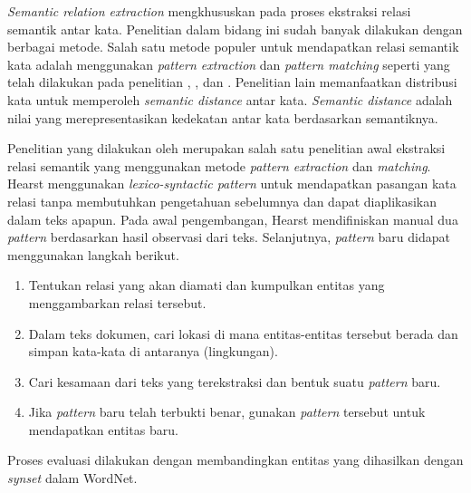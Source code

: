 \textit{Semantic relation extraction} mengkhususkan pada proses ekstraksi relasi semantik antar kata. Penelitian dalam bidang ini sudah banyak dilakukan dengan berbagai metode. Salah satu metode populer untuk mendapatkan relasi semantik kata adalah menggunakan \textit{pattern extraction} dan \textit{pattern matching} seperti yang telah dilakukan pada penelitian \cite{hearst1992automatic}, \cite{ruiz2005automatic}, dan \cite{arnold2014extracting}. Penelitian lain memanfaatkan distribusi kata untuk memperoleh \textit{semantic distance} antar kata. \textit{Semantic distance} adalah nilai yang merepresentasikan kedekatan antar kata berdasarkan semantiknya.

Penelitian yang dilakukan oleh \cite{hearst1992automatic} merupakan salah satu penelitian awal ekstraksi relasi semantik yang menggunakan metode \textit{pattern extraction} dan \textit{matching}. Hearst menggunakan \textit{lexico-syntactic pattern} untuk mendapatkan pasangan kata relasi tanpa membutuhkan pengetahuan sebelumnya dan dapat diaplikasikan dalam teks apapun. Pada awal pengembangan, Hearst mendifiniskan manual dua \textit{pattern} berdasarkan hasil observasi dari teks. Selanjutnya, \textit{pattern} baru didapat menggunakan langkah berikut. 
\begin{enumerate}
  \item Tentukan relasi yang akan diamati dan kumpulkan entitas yang menggambarkan relasi tersebut.
  \item Dalam teks dokumen, cari lokasi di mana entitas-entitas tersebut berada dan simpan kata-kata di antaranya (lingkungan).
  \item Cari kesamaan dari teks yang terekstraksi dan bentuk suatu \textit{pattern} baru.
  \item Jika \textit{pattern} baru telah terbukti benar, gunakan \textit{pattern} tersebut untuk mendapatkan entitas baru.
\end{enumerate}
Proses evaluasi dilakukan dengan membandingkan entitas yang dihasilkan dengan \textit{synset} dalam WordNet. 

